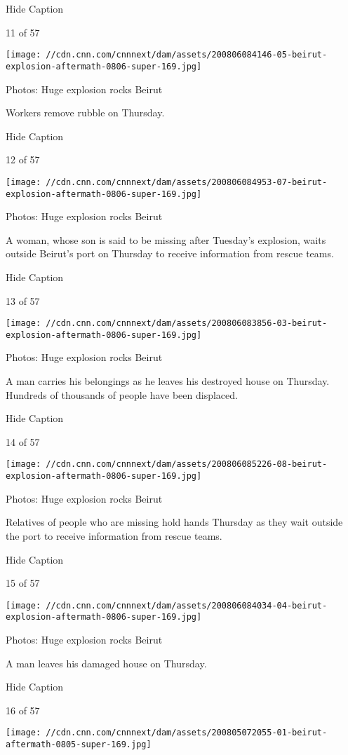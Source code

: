 Hide Caption

11 of 57

\texttt{[image: //cdn.cnn.com/cnnnext/dam/assets/200806084146-05-beirut-explosion-aftermath-0806-super-169.jpg]}

Photos: Huge explosion rocks Beirut

Workers remove rubble on Thursday.

Hide Caption

12 of 57

\texttt{[image: //cdn.cnn.com/cnnnext/dam/assets/200806084953-07-beirut-explosion-aftermath-0806-super-169.jpg]}

Photos: Huge explosion rocks Beirut

A woman, whose son is said to be missing after Tuesday's explosion,
waits outside Beirut's port on Thursday to receive information from
rescue teams.

Hide Caption

13 of 57

\texttt{[image: //cdn.cnn.com/cnnnext/dam/assets/200806083856-03-beirut-explosion-aftermath-0806-super-169.jpg]}

Photos: Huge explosion rocks Beirut

A man carries his belongings as he leaves his destroyed house on
Thursday. Hundreds of thousands of people have been displaced.

Hide Caption

14 of 57

\texttt{[image: //cdn.cnn.com/cnnnext/dam/assets/200806085226-08-beirut-explosion-aftermath-0806-super-169.jpg]}

Photos: Huge explosion rocks Beirut

Relatives of people who are missing hold hands Thursday as they wait
outside the port to receive information from rescue teams.

Hide Caption

15 of 57

\texttt{[image: //cdn.cnn.com/cnnnext/dam/assets/200806084034-04-beirut-explosion-aftermath-0806-super-169.jpg]}

Photos: Huge explosion rocks Beirut

A man leaves his damaged house on Thursday.

Hide Caption

16 of 57

\texttt{[image: //cdn.cnn.com/cnnnext/dam/assets/200805072055-01-beirut-aftermath-0805-super-169.jpg]}

